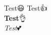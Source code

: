 \documentclass[luatex,unicode]{beamer}
\begin{document}
\begin{frame}{Test😃}
  Test👍\\
  \textbf{Test}👌\\
  \textit{Test}💕
\end{frame}
\end{document}

